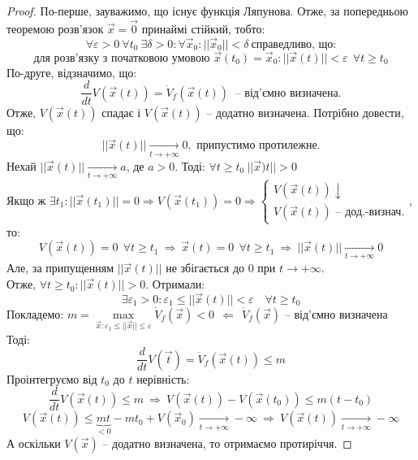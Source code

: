 \documentclass[14pt,a4paper]{scrartcl}
\theoremstyle{definition}
\theoremstyle{definition}
\theoremstyle{definition}
\begin{document}
\begin{proof}
  По-перше, зауважимо, що існує функція Ляпунова. Отже, за попередньою теоремою розв'язок $\overrightarrow{x}  = \overrightarrow{0} $ принаймі стійкий, тобто:
  $$
  \forall \varepsilon  >0 \ \forall t_0 \ \exists \delta > 0 : \forall \overrightarrow{x}_0 : ||\overrightarrow{x}_0|| < \delta \ \text{справедливо, що:}
  $$
  $$
  \text{для розв'язку з початковою умовою } \overrightarrow{x}(t_0) = \overrightarrow{x}_0 : ||\overrightarrow{x}(t)|| < \varepsilon \ \  \forall t \geq t_0
  $$
  По-друге, відзначимо, що:
  $$
  \frac{d}{dt} V (\overrightarrow{x}(t)) = \dot{V}_f ( \overrightarrow{x}(t)) \ \text{ -- від'ємно визначена.}
  $$
  Отже, $V( \overrightarrow{x} (t))$ спадає і $V(\overrightarrow{x}(t))$ -- додатно визначена. Потрібно довести, що: $$||\overrightarrow{x} (t)|| \xrightarrow[t \to +\infty]{} 0, \text{ припустимо протилежне.}$$
  Нехай $|| \overrightarrow{x}(t)|| \xrightarrow[t \to + \infty]{} a $, де $a > 0$. Тоді: $\forall t \geq t_0 \ ||\overrightarrow{x})t||>0 $ \\ Якщо ж $\exists t_1: ||\overrightarrow{x}(t_1)|| = 0 \Rightarrow V(\overrightarrow{x}(t_1)) = 0 \Rightarrow \begin{cases}
   V(\overrightarrow{x}(t)) \! \downarrow \\
   V(\overrightarrow{x}(t)) \text{ -- дод.-визнач.}
  \end{cases}$, то:
$$
V(\overrightarrow{x}(t))  = 0 \ \ \forall t \geq t_1\ \Rightarrow\ \overrightarrow{x}(t) = 0 \ \ \forall t \geq t_1\ \Rightarrow\ ||\overrightarrow{x}(t)|| \xrightarrow[ t \to +\infty]{} 0
$$
Але, за припущенням $||\overrightarrow{x}(t)||$ не збігається до 0 при $t \to + \infty$.\\
Отже, $\forall t \geq t_0: ||\overrightarrow{x}(t)|| > 0$. Отримали:
$$
\exists \varepsilon _1 > 0 : \varepsilon_1 \leq ||\overrightarrow{x} (t)|| < \varepsilon  \quad \forall t \geq t_0
$$
Покладемо: $ m = \max\limits_{\overrightarrow{x}: \varepsilon_1 \leq  ||\overrightarrow{x}|| \leq \varepsilon } \dot{V}_f ( \overrightarrow{x} ) < 0 \ \  \Longleftarrow \ \ \dot{V}_f (\overrightarrow{x}) \text{ -- від'ємно визначена }$
Тоді:
$$
\frac{d}{dt} V(\overrightarrow{t}) = \dot{V}_f (\overrightarrow{x}(t))  \leq m
$$
Проінтегруємо від $t_0$ до $t$ нерівність:
$$
\frac{d}{dt} V(\overrightarrow{x} (t)) \leq m \ \Longrightarrow \  V(\overrightarrow{x} (t)) - V(\overrightarrow{x} (t_0)) \leq  m (t-t_0)
$$
$$
V(\overrightarrow{x}(t)) \leq \underbrace{mt}_{<0} - mt_0 + V(\overrightarrow{x}_0) \xrightarrow[t \to + \infty]{} -\infty \ \Longrightarrow \ V(\overrightarrow{x} (t)) \xrightarrow[t\to+\infty]{}  -\infty
$$
А оскільки $V(\overrightarrow{x})$ -- додатно визначена, то отримаємо протиріччя.
\end{proof}
\end{document}
